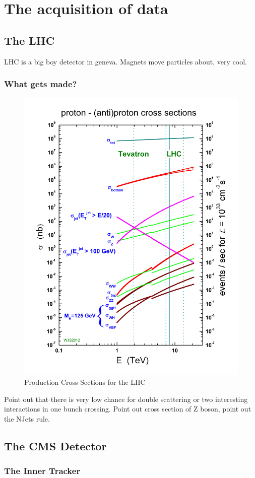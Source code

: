 \chapter{The acquisition of data}

\section{The LHC}
LHC is a big boy detector in geneva. Magnets move particles about, very cool.  
\subsection{What gets made?}
\begin{figure}[h!]
  \centering
  \includegraphics[width=.7\textwidth]{figures/lhc_decay_modes.jpg}
  \caption{Production Cross Sections for the LHC}
  \label{fig:lhc_decay_modes}
\end{figure}

Point out that there is very low chance for double scattering or two interesting interactions in one bunch crossing. Point out cross section of Z boson, point out the NJets rule.

\section{The CMS Detector}
\subsection{The Inner Tracker}

